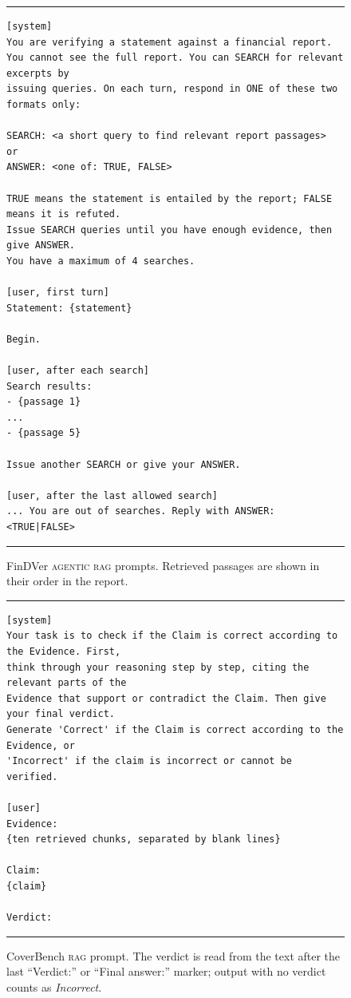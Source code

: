\documentclass[11pt]{article}
\begin{document}
\begin{figure}[H]
\centering
\begin{minipage}{0.92\textwidth}
\footnotesize
\hrule\vspace{4pt}
\begin{verbatim}
[system]
You are verifying a statement against a financial report.
You cannot see the full report. You can SEARCH for relevant excerpts by
issuing queries. On each turn, respond in ONE of these two formats only:

SEARCH: <a short query to find relevant report passages>
or
ANSWER: <one of: TRUE, FALSE>

TRUE means the statement is entailed by the report; FALSE means it is refuted.
Issue SEARCH queries until you have enough evidence, then give ANSWER.
You have a maximum of 4 searches.

[user, first turn]
Statement: {statement}

Begin.

[user, after each search]
Search results:
- {passage 1}
...
- {passage 5}

Issue another SEARCH or give your ANSWER.

[user, after the last allowed search]
... You are out of searches. Reply with ANSWER: <TRUE|FALSE>
\end{verbatim}
\vspace{2pt}\hrule
\end{minipage}
\caption{FinDVer \textsc{agentic rag} prompts. Retrieved passages are shown
in their order in the report.}
\label{fig:prompt_fv_agentic}
\end{figure}

\begin{figure}[H]
\centering
\begin{minipage}{0.92\textwidth}
\footnotesize
\hrule\vspace{4pt}
\begin{verbatim}
[system]
Your task is to check if the Claim is correct according to the Evidence. First,
think through your reasoning step by step, citing the relevant parts of the
Evidence that support or contradict the Claim. Then give your final verdict.
Generate 'Correct' if the Claim is correct according to the Evidence, or
'Incorrect' if the claim is incorrect or cannot be verified.

[user]
Evidence:
{ten retrieved chunks, separated by blank lines}

Claim:
{claim}

Verdict:
\end{verbatim}
\vspace{2pt}\hrule
\end{minipage}
\caption{CoverBench \textsc{rag} prompt. The verdict is read from the text
after the last ``Verdict:'' or ``Final answer:'' marker; output with no
verdict counts as \textit{Incorrect}.}
\label{fig:prompt_cb_rag}
\end{figure}
\end{document}
